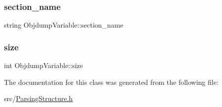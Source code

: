 \mbox{\label{classObjdumpVariable_aa5939518d5ef92b43be57a8daeef30e7}} 
\subsubsection{\texorpdfstring{section\+\_\+name}{section\_name}}
{\footnotesize\ttfamily string Objdump\+Variable\+::section\+\_\+name}

\mbox{\label{classObjdumpVariable_ac3d9609f3f9dfaf34b750d4d04f2935a}} 
\subsubsection{\texorpdfstring{size}{size}}
{\footnotesize\ttfamily int Objdump\+Variable\+::size}



The documentation for this class was generated from the following file\+:\begin{DoxyCompactItemize}
\item 
src/\hyperlink{ParsingStructure_8h}{Parsing\+Structure.\+h}\end{DoxyCompactItemize}
